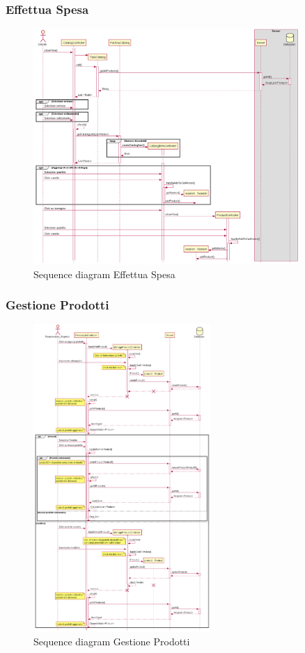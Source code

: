 \documentclass[12pt, a4paper]{report}
\begin{document}
\newpage

\subsubsection{Effettua Spesa}

\begin{figure}[h]
  \centering
  \includegraphics[width=0.9\textwidth]{sequence_effettua_spesa.png}
  \caption{Sequence diagram Effettua Spesa}
\end{figure}

\newpage

\subsubsection{Gestione Prodotti}

\begin{figure}[h]
  \centering
  \includegraphics[width=0.6\textwidth]{sequence_gestione_prodotto.png}
  \caption{Sequence diagram Gestione Prodotti}
\end{figure}
\end{document}
